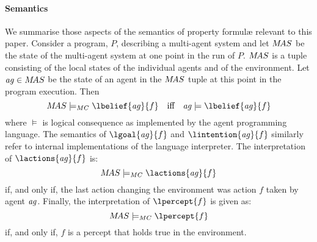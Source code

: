 \documentclass[a4]{article}
\begin{document}
\paragraph{\psl{} Semantics}
We summarise those aspects of the semantics of property formul\ae{} relevant to this paper.
Consider a program, $P$, describing a multi-agent system and let
$M\!AS$ be the state of the multi-agent system at one point in the run
of $P$.  $M\!AS$ is a tuple consisting of the local states of the individual agents and of the environment. Let $\mathit{ag} \in M\!AS$ be the state of an agent in the $M\!AS$ tuple at this point in the 
program execution. Then 
$$
\MAS \models_{MC} \lbelief{\AILagent}{f} \text{\quad iff\quad }
\AILagent \models  \lbelief{\AILagent}{f}
$$
where $\models$ is logical consequence as implemented by the agent
programming language. The semantics of $\lgoal{\AILagent}{f}$ and $\lintention{\AILagent}{f}$ similarly refer to internal implementations of the language interpreter. 
The interpretation of $\lactions{\AILagent}{f}$ is:
$$\MAS \models_{MC}
\lactions{\AILagent}{f}$$ if, and only if, the last action changing
the environment was action $f$ taken by agent $\mathit{ag}$.  Finally, the interpretation of
$\lpercept{f}$ is given as:
$$\MAS
\models_{MC} \lpercept{f}$$ if, and only if, $f$ is a percept that
holds true in the environment.
\medskip
\end{document}
